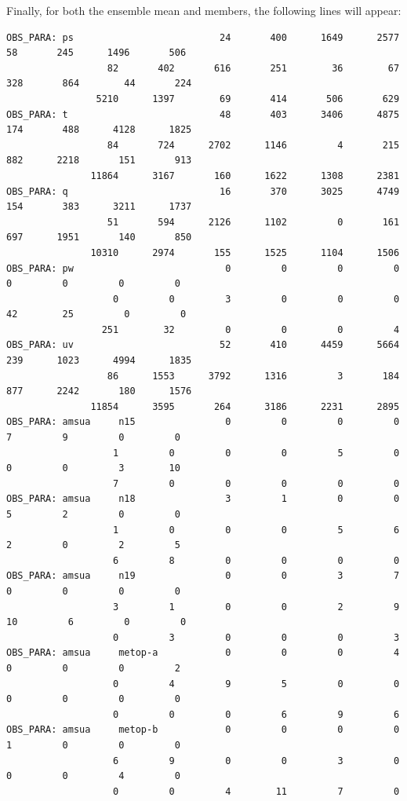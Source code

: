 \begin{enumerate}
\begin{description}
Finally, for both the ensemble mean and members, the following lines will appear:

\begin{tiny}
\begin{verbatim}
OBS_PARA: ps                          24       400      1649      2577        58       245      1496       506
                  82       402       616       251        36        67       328       864        44       224
                5210      1397        69       414       506       629
OBS_PARA: t                           48       403      3406      4875       174       488      4128      1825
                  84       724      2702      1146         4       215       882      2218       151       913
               11864      3167       160      1622      1308      2381
OBS_PARA: q                           16       370      3025      4749       154       383      3211      1737
                  51       594      2126      1102         0       161       697      1951       140       850
               10310      2974       155      1525      1104      1506
OBS_PARA: pw                           0         0         0         0         0         0         0         0
                   0         0         3         0         0         0        42        25         0         0
                 251        32         0         0         0         4
OBS_PARA: uv                          52       410      4459      5664       239      1023      4994      1835
                  86      1553      3792      1316         3       184       877      2242       180      1576
               11854      3595       264      3186      2231      2895
OBS_PARA: amsua     n15                0         0         0         0         7         9         0         0
                   1         0         0         0         5         0         0         0         3        10
                   7         0         0         0         0         0
OBS_PARA: amsua     n18                3         1         0         0         5         2         0         0
                   1         0         0         0         5         6         2         0         2         5
                   6         8         0         0         0         0
OBS_PARA: amsua     n19                0         0         3         7         0         0         0         0
                   3         1         0         0         2         9        10         6         0         0
                   0         3         0         0         0         3
OBS_PARA: amsua     metop-a            0         0         0         4         0         0         0         2
                   0         4         9         5         0         0         0         0         0         0
                   0         0         0         6         9         6
OBS_PARA: amsua     metop-b            0         0         0         0         1         0         0         0
                   6         9         0         0         3         0         0         0         4         0
                   0         0         4        11         7         0
\end{verbatim}
\end{tiny}


\end{description}
\end{enumerate}
